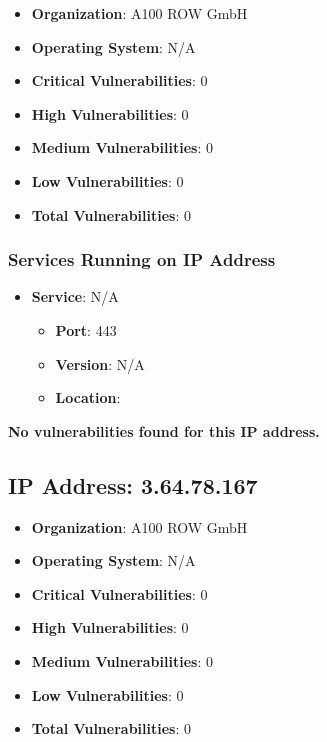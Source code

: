 \documentclass{article}
\begin{document}
\begin{itemize}
    \item \textbf{Organization}: A100 ROW GmbH
    \item \textbf{Operating System}:  N/A 
    \item \textbf{Critical Vulnerabilities}: 0
    \item \textbf{High Vulnerabilities}: 0
    \item \textbf{Medium Vulnerabilities}: 0
    \item \textbf{Low Vulnerabilities}: 0
    \item \textbf{Total Vulnerabilities}: 0
\end{itemize}

\subsubsection*{Services Running on IP Address}

\begin{itemize}
    
        \item \textbf{Service}: N/A
        \begin{itemize}
            \item \textbf{Port}: 443
            \item \textbf{Version}:  N/A 
            \item \textbf{Location}: \href{  }{  }
        \end{itemize}
    
\end{itemize}


\textbf{No vulnerabilities found for this IP address.}




\clearpage



\subsection{IP Address: 3.64.78.167}

\begin{itemize}
    \item \textbf{Organization}: A100 ROW GmbH
    \item \textbf{Operating System}:  N/A 
    \item \textbf{Critical Vulnerabilities}: 0
    \item \textbf{High Vulnerabilities}: 0
    \item \textbf{Medium Vulnerabilities}: 0
    \item \textbf{Low Vulnerabilities}: 0
    \item \textbf{Total Vulnerabilities}: 0
\end{itemize}
\end{document}
